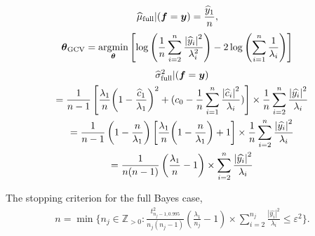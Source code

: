 \documentclass[twocolumn]{svjour3}          %
\newcommand{\bm}[1]{\boldsymbol{#1}}
\newcommand{\posIntegers}{\mathbb{Z}_{> 0}}
\newcommand{\vtheta}{{\bm{\theta}}}
\newcommand{\vf}{\bm{f}}
\newcommand{\vy}{\bm{y}}
\def\abs#1{\ensuremath{\left \lvert #1 \right \rvert}}
\providecommand{\argmin}{\operatorname*{argmin}}
\begin{document}
\begin{align}
\label{FJH:eq:cubFull}
\widehat{\mu}_{\textup{full}}  \vert ( \vf = \vy) &= 
 \frac{\widehat{y}_1}{n} ,
\end{align}
\begin{align}
\vtheta_{\textup{GCV}} 
&= \argmin_\vtheta \left[ \log \left ( \frac 1n \sum_{i=2}^n \frac{\abs{\widehat{y}_i}^2}{\lambda_i^2} 
\right) -2\log\left( \sum_{i=1}^n \frac{1}{\lambda_i} \right)
\right]
\end{align}
\begin{multline*}
\widehat{\sigma}^2_{\textup{full}}  \vert ( \vf = \vy) \\ 
= 
\frac{1}{n-1} \left[\frac{\lambda_1}{n}{\left(1 - \frac{\widehat{c}_1}{\lambda_1}\right)^2} + (c_0  - \frac 1n \sum_{i=1}^n \frac{\abs{\widehat{c}_i}^2}{\lambda_i}) \right] 
\times
\frac{1}{n} \sum_{i=2}^n \frac{\abs{\widehat{y_i}}^2}{\lambda_i} 
\\
= 
\frac{1}{n-1} \left( 1- \frac{n}{\lambda_1}\right) \left[\frac{\lambda_1}{n}{\left(1 - \frac{n}{\lambda_1}\right)} + 1\right] 
\times
\frac{1}{n} \sum_{i=2}^n \frac{\abs{\widehat{y_i}}^2}{\lambda_i} 
\\
= 
\frac{1}{n(n-1)} \left( \frac{\lambda_1}{n} - 1\right)  
\times
 \sum_{i=2}^n \frac{\abs{\widehat{y_i}}^2}{\lambda_i} 
\end{multline*}

The stopping criterion for the full Bayes case,  
\begin{multline} \label{FJH:eq:stopcritHyper}
n  = \min \biggl \{n_j \in \posIntegers:  
\frac {t_{n_j-1,0.995}^2}{n_j(n_j - 1)} 
\left( \frac{\lambda_1}{n_j} - 1\right)  
\times
 \sum_{i=2}^{n_j} \frac{\abs{\widehat{y_i}}^2}{\lambda_i}  \le \varepsilon^2 \biggr\}.
\end{multline}
\end{document}
